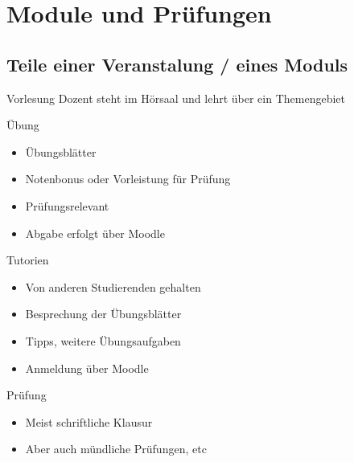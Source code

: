 \documentclass[
	aspectratio=169, 
	8pt 
]{beamer}
\begin{document}
\section{Module und Prüfungen}
\subsection{Teile einer Veranstalung / eines Moduls}
\begin{frame}{\insertsubsection}
    \begin{fancycolumns}[columns=2]
        \begin{definition}{Vorlesung}
            Dozent steht im Hörsaal und lehrt über ein Themengebiet
        \end{definition}
        
        \begin{definition}{Übung}
            \begin{itemize}
                \item Übungsblätter
                \item Notenbonus oder Vorleistung für Prüfung
                \item Prüfungsrelevant
                \item Abgabe erfolgt über Moodle
            \end{itemize}
        \end{definition}
        
        \nextcolumn
        \begin{definition}{Tutorien}
            \begin{itemize}
                \item Von anderen Studierenden gehalten
                \item Besprechung der Übungsblätter 
                \item Tipps, weitere Übungsaufgaben
                \item Anmeldung über Moodle
            \end{itemize}
        \end{definition}

        \begin{definition}{Prüfung}
            \begin{itemize}
                \item Meist schriftliche Klausur
                \item Aber auch mündliche Prüfungen, etc
            \end{itemize}
        \end{definition}

    \end{fancycolumns}

\end{frame}
\end{document}
